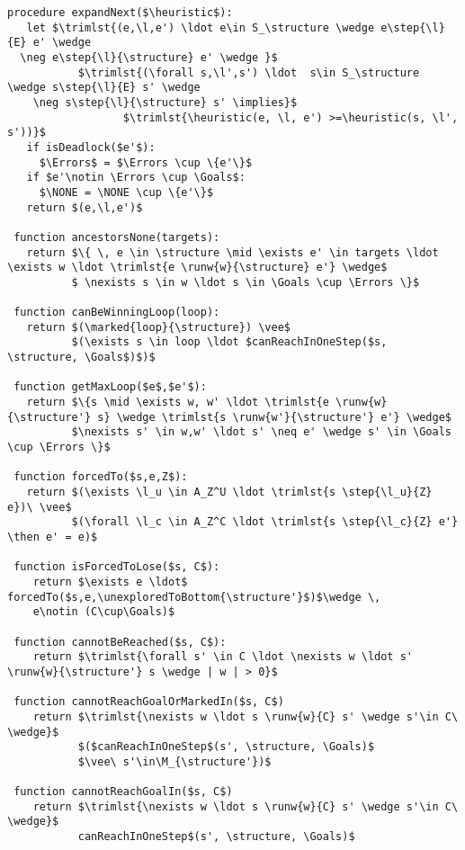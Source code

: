 \begin{lstlisting}[language={pseudocode},label={lst:dcs.aux},caption={auxiliary procedures.},float=ht, frame=single]
 procedure expandNext($\heuristic$):
   let $\trimlst{(e,\l,e') \ldot e\in S_\structure \wedge e\step{\l}{E} e' \wedge   
  \neg e\step{\l}{\structure} e' \wedge }$ 
           $\trimlst{(\forall s,\l',s') \ldot  s\in S_\structure \wedge s\step{\l}{E} s' \wedge   
    \neg s\step{\l}{\structure} s' \implies}$ 
                  $\trimlst{\heuristic(e, \l, e') >=\heuristic(s, \l',   s'))}$
   if isDeadlock($e'$):
     $\Errors$ = $\Errors \cup \{e'\}$
   if $e'\notin \Errors \cup \Goals$:
     $\NONE = \NONE \cup \{e'\}$
   return $(e,\l,e')$
 
 function ancestorsNone(targets):
   return $\{ \, e \in \structure \mid \exists e' \in targets \ldot \exists w \ldot \trimlst{e \runw{w}{\structure} e'} \wedge$
          $ \nexists s \in w \ldot s \in \Goals \cup \Errors \}$
   
 function canBeWinningLoop(loop):
   return $(\marked{loop}{\structure}) \vee$ 
          $(\exists s \in loop \ldot $canReachInOneStep($s, \structure, \Goals$)$)$
   
 function getMaxLoop($e$,$e'$):
   return $\{s \mid \exists w, w' \ldot \trimlst{e \runw{w}{\structure'} s} \wedge \trimlst{s \runw{w'}{\structure'} e'} \wedge$ 
          $\nexists s' \in w,w' \ldot s' \neq e' \wedge s' \in \Goals \cup \Errors \}$

 function forcedTo($s,e,Z$):
   return $(\exists \l_u \in A_Z^U \ldot \trimlst{s \step{\l_u}{Z} e})\ \vee$
          $(\forall \l_c \in A_Z^C \ldot \trimlst{s \step{\l_c}{Z} e'} \then e' = e)$ 
          
 function isForcedToLose($s, C$):
    return $\exists e \ldot$ forcedTo($s,e,\unexploredToBottom{\structure'}$)$\wedge \,
    e\notin (C\cup\Goals)$
    
 function cannotBeReached($s, C$):
    return $\trimlst{\forall s' \in C \ldot \nexists w \ldot s' \runw{w}{\structure'} s \wedge | w | > 0}$
   
 function cannotReachGoalOrMarkedIn($s, C$)
    return $\trimlst{\nexists w \ldot s \runw{w}{C} s' \wedge s'\in C\ \wedge}$ 
           $($canReachInOneStep$(s', \structure, \Goals)$
           $\vee\ s'\in\M_{\structure'})$
           
 function cannotReachGoalIn($s, C$)
    return $\trimlst{\nexists w \ldot s \runw{w}{C} s' \wedge s'\in C\ \wedge}$ 
           canReachInOneStep$(s', \structure, \Goals)$
\end{lstlisting}

%
%
%   

